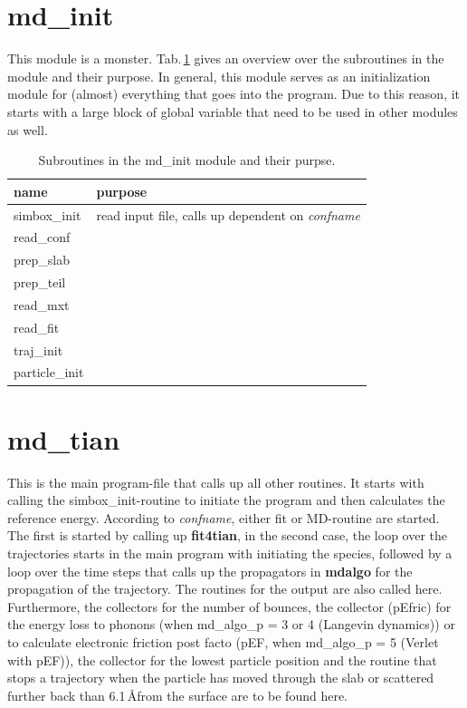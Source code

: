 \documentclass[twoside, 11pt, titlepage, captions=nooneline, a4paper, headsepline]{scrbook}%
\begin{document}
\section{md\_init}
This module is a monster. Tab.\,\ref{Tab:Funct:mdinit} gives an overview over the subroutines in the module and their purpose. In general, this module serves as an initialization module for (almost) everything that goes into the program. Due to this reason, it starts with a large block of global variable that need to be used in other modules as well.
\begin{table}[b!]
\centering
\caption{Subroutines in the md\_init module and their purpse.}
\label{Tab:Funct:mdinit}
\begin{tabular}{ll}
\hline\hline
name			&purpose			\\
\hline
simbox\_init & read input file, calls up dependent on \textit{confname}\\
read\_conf&\\
prep\_slab&\\
prep\_teil&\\
read\_mxt&\\
read\_fit&\\
traj\_init&\\
particle\_init&\\

\hline
\hline
\end{tabular}
\end{table}

\section{md\_tian}
This is the main program-file that calls up all other routines. It starts with calling the simbox\_init-routine to initiate the program and then calculates the reference energy. According to \textit{confname}, either fit or MD-routine are started. The first is started by calling up \textbf{fit4tian}, in the second case, the loop over the trajectories starts in the main program with initiating the species, followed by a loop over the time steps that calls up the propagators in \textbf{mdalgo} for the propagation of the trajectory. The routines for the output are also called here. Furthermore, the collectors for the number of bounces, the collector (pEfric) for the energy loss to phonons (when md\_algo\_p = 3 or 4 (Langevin dynamics)) or to calculate electronic friction post facto (pEF, when md\_algo\_p = 5 (Verlet with pEF)), the collector for the lowest particle position and the routine that stops a trajectory when the particle has moved through the slab or scattered further back than 6.1\,\AA from the surface are to be found here.
\end{document}
